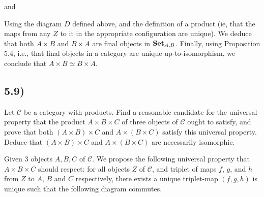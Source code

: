 \documentclass[12pt, letterpaper, twoside]{report}
\begin{document}
and


Using the diagram $D$ defined above, and the definition of a product (ie, that the maps from any $Z$ to it in the appropriate configuration are unique). We deduce that both $A \times B$ and $B \times A$ are final objects in $\text{\textbf{Set}}_{A,B}$. Finally, using Proposition 5.4, i.e., that final objects in a category are unique up-to-isomorphism, we conclude that $A \times B \simeq B \times A$.



\subsection*{5.9)}

Let $\mathcal{C}$ be a category with products. Find a reasonable candidate for the universal property that the product $A \times B \times C$ of three objects of $\mathcal{C}$ ought to satisfy, and prove that both $(A \times B) \times C$ and $A \times (B \times C)$ satisfy this universal property. Deduce that $(A \times B) \times C$ and $A \times (B \times C)$ are necessarily isomorphic.

Given 3 objects $A, B, C$ of $\mathcal{C}$. We propose the following universal property that $A \times B \times C$ should respect: for all objects $Z$ of $\mathcal{C}$, and triplet of maps $f$, $g$, and $h$ from $Z$ to $A$, $B$ and $C$ respectively, there exists a unique triplet-map $(f,g,h)$ is unique such that the following diagram commutes.
\end{document}
